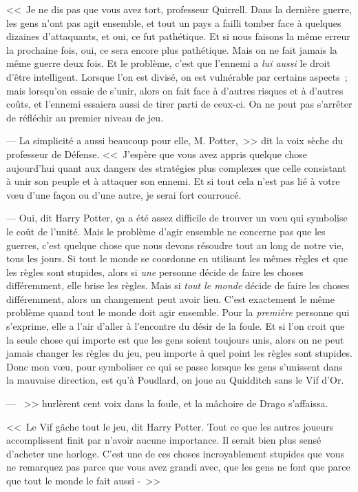 <<~Je ne dis pas que vous avez tort, professeur Quirrell. Dans la dernière guerre, les gens n'ont pas agit ensemble, et tout un pays a failli tomber face à quelques dizaines d'attaquants, et oui, ce fut pathétique. Et si nous faisons la même erreur la prochaine fois, oui, ce sera encore plus pathétique. Mais on ne fait jamais la même guerre deux fois. Et le problème, c'est que l'ennemi a \emph{lui aussi} le droit d'être intelligent. Lorsque l'on est divisé, on est vulnérable par certains aspects~; mais lorsqu'on essaie de s'unir, alors on fait face à d'autres risques et à d'autres coûts, et l'ennemi essaiera aussi de tirer parti de ceux-ci. On ne peut pas s'arrêter de réfléchir au premier niveau de jeu.

--- La simplicité a aussi beaucoup pour elle, M. Potter,~>> dit la voix sèche du professeur de Défense. <<~J'espère que vous avez appris quelque chose aujourd'hui quant aux dangers des stratégies plus complexes que celle consistant à unir son peuple et à attaquer son ennemi. Et si tout cela n'est pas lié à votre vœu d'une façon ou d'une autre, je serai fort courroucé.

--- Oui, dit Harry Potter, ça a été assez difficile de trouver un vœu qui symbolise le coût de l'unité. Mais le problème d'agir ensemble ne concerne pas que les guerres, c'est quelque chose que nous devons résoudre tout au long de notre vie, tous les jours. Si tout le monde se coordonne en utilisant les mêmes règles et que les règles sont stupides, alors si \emph{une} personne décide de faire les choses différemment, elle brise les règles. Mais si \emph{tout le monde} décide de faire les choses différemment, alors un changement peut avoir lieu. C'est exactement le même problème quand tout le monde doit agir ensemble. Pour la \emph{première} personne qui s'exprime, elle a l'air d'aller à l'encontre du désir de la foule. Et si l'on croit que la seule chose qui importe est que les gens soient toujours unis, alors on ne peut jamais changer les règles du jeu, peu importe à quel point les règles sont stupides. Donc mon vœu, pour symboliser ce qui se passe lorsque les gens s'unissent dans la mauvaise direction, est qu'à Poudlard, on joue au Quidditch sans le Vif d'Or.

--- ~>> hurlèrent cent voix dans la foule, et la mâchoire de Drago s'affaissa.

<<~Le Vif gâche tout le jeu, dit Harry Potter. Tout ce que les autres joueurs accomplissent finit par n'avoir aucune importance. Il serait bien plus sensé d'acheter une horloge. C'est une de ces choses incroyablement stupides que vous ne remarquez pas parce que vous avez grandi avec, que les gens ne font que parce que tout le monde le fait aussi -~>>

